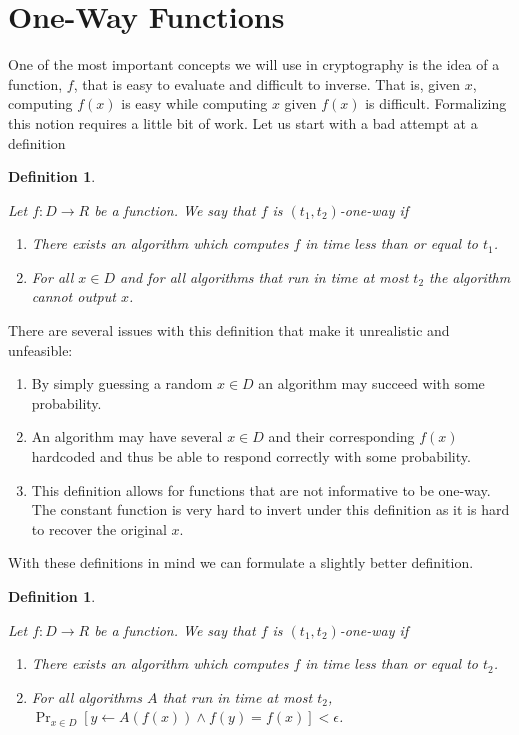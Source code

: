 \documentclass{article}
\newtheorem{defn}[thm]{Definition}
\newenvironment{definition}{\begin{defn}\begin{em}}%
{\end{em}\end{defn}}
\begin{document}
\section{One-Way Functions}
One of the most important concepts we will use in cryptography is the idea of a function, $f$, that is easy to evaluate and difficult to inverse.  That is, given $x$, computing $f(x)$ is easy while computing $x$ given $f(x)$ is difficult.  Formalizing this notion requires a little bit of work.  Let us start with a bad attempt at a definition

\begin{definition}
Let $f: D\rightarrow R$ be a function.  We say that $f$ is $(t_1,t_2)$-\emph{one-way} if 
\begin{enumerate}
\item There exists an algorithm which computes $f$ in time less than or equal to $t_1$.
\item For all $x\in D$ and for all algorithms that run in time at most $t_2$ the algorithm cannot output $x$.
\end{enumerate}
\end{definition}
There are several issues with this definition that make it unrealistic and unfeasible:
\begin{enumerate}
\item By simply guessing a random $x\in D$ an algorithm may succeed with some probability.
\item An algorithm may have several $x\in D$ and their corresponding $f(x)$ hardcoded and thus be able to respond correctly with some probability.
\item This definition allows for functions that are not informative to be one-way.  The constant function is very hard to invert under this definition as it is hard to recover the original $x$.
\end{enumerate}
With these definitions in mind we can formulate a slightly better definition.
\begin{definition}
Let $f: D\rightarrow R$ be a function.  We say that $f$ is $(t_1,t_2)$-\emph{one-way} if 
\begin{enumerate}
\item There exists an algorithm which computes $f$ in time less than or equal to $t_2$.
\item For all algorithms $A$ that run in time at most $t_2$, $\Pr_{x\in D}[y\leftarrow A(f(x)) \wedge f(y) = f(x)]<\epsilon$.
\end{enumerate}
\end{definition}
\end{document}
